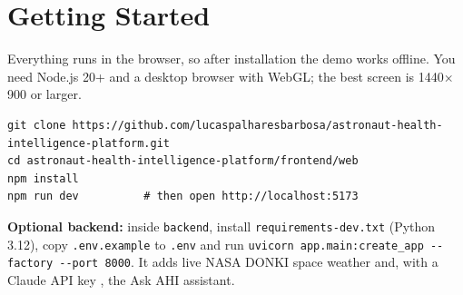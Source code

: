 \section{Getting Started}
\label{sec:getting-started}

Everything runs in the browser, so after installation the demo works offline. You need Node.js 20+ and a desktop browser with WebGL; the best screen is 1440$\times$900 or larger.

{\footnotesize
\begin{verbatim}
git clone https://github.com/lucaspalharesbarbosa/astronaut-health-intelligence-platform.git
cd astronaut-health-intelligence-platform/frontend/web
npm install
npm run dev          # then open http://localhost:5173
\end{verbatim}
}

\textbf{Optional backend:} inside \texttt{backend}, install \texttt{requirements-dev.txt} (Python 3.12), copy \texttt{.env.example} to \texttt{.env} and run \verb|uvicorn app.main:create_app --factory --port 8000|. It adds live NASA DONKI space weather \cite{nasa_donki} and, with a Claude API key \cite{anthropic_claude_api}, the Ask AHI assistant.
